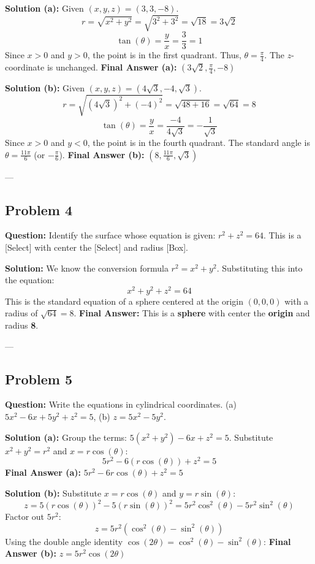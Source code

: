 \documentclass[11pt]{article}
\begin{document}
\textbf{Solution (a):}
Given $(x, y, z) = (3, 3, -8)$.
\[ r = \sqrt{x^2 + y^2} = \sqrt{3^2 + 3^2} = \sqrt{18} = 3\sqrt{2} \]
\[ \tan(\theta) = \frac{y}{x} = \frac{3}{3} = 1 \]
Since $x > 0$ and $y > 0$, the point is in the first quadrant. Thus, $\theta = \frac{\pi}{4}$.
The $z$-coordinate is unchanged.
\textbf{Final Answer (a):} $\left(3\sqrt{2}, \frac{\pi}{4}, -8\right)$

\textbf{Solution (b):}
Given $(x, y, z) = (4\sqrt{3}, -4, \sqrt{3})$.
\[ r = \sqrt{(4\sqrt{3})^2 + (-4)^2} = \sqrt{48 + 16} = \sqrt{64} = 8 \]
\[ \tan(\theta) = \frac{y}{x} = \frac{-4}{4\sqrt{3}} = -\frac{1}{\sqrt{3}} \]
Since $x > 0$ and $y < 0$, the point is in the fourth quadrant. The standard angle is $\theta = \frac{11\pi}{6}$ (or $-\frac{\pi}{6}$).
\textbf{Final Answer (b):} $\left(8, \frac{11\pi}{6}, \sqrt{3}\right)$

---

\subsection*{Problem 4}
\textbf{Question:} Identify the surface whose equation is given: $r^2 + z^2 = 64$.
This is a [Select] with center the [Select] and radius [Box].

\textbf{Solution:}
We know the conversion formula $r^2 = x^2 + y^2$. Substituting this into the equation:
\[ x^2 + y^2 + z^2 = 64 \]
This is the standard equation of a sphere centered at the origin $(0,0,0)$ with a radius of $\sqrt{64} = 8$.
\textbf{Final Answer:} This is a \textbf{sphere} with center the \textbf{origin} and radius \textbf{8}.

---

\subsection*{Problem 5}
\textbf{Question:} Write the equations in cylindrical coordinates. (a) $5x^2 - 6x + 5y^2 + z^2 = 5$, (b) $z = 5x^2 - 5y^2$.

\textbf{Solution (a):}
Group the terms: $5(x^2 + y^2) - 6x + z^2 = 5$.
Substitute $x^2 + y^2 = r^2$ and $x = r\cos(\theta)$:
\[ 5r^2 - 6(r\cos(\theta)) + z^2 = 5 \]
\textbf{Final Answer (a):} $5r^2 - 6r\cos(\theta) + z^2 = 5$

\textbf{Solution (b):}
Substitute $x = r\cos(\theta)$ and $y = r\sin(\theta)$:
\[ z = 5(r\cos(\theta))^2 - 5(r\sin(\theta))^2 = 5r^2\cos^2(\theta) - 5r^2\sin^2(\theta) \]
Factor out $5r^2$:
\[ z = 5r^2(\cos^2(\theta) - \sin^2(\theta)) \]
Using the double angle identity $\cos(2\theta) = \cos^2(\theta) - \sin^2(\theta)$:
\textbf{Final Answer (b):} $z = 5r^2\cos(2\theta)$
\end{document}
